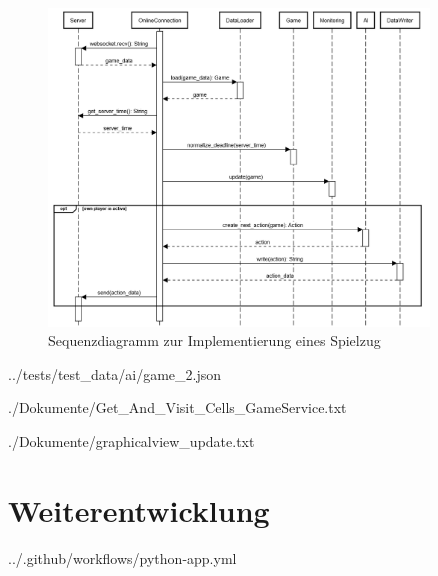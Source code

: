 \begin{figure}[htb]
	\centering
	\includegraphics[width=0.9\textwidth]{Bilder/Sequenzdiagramm_Implementierung_Spielzug.png}
	\caption{Sequenzdiagramm zur Implementierung eines Spielzug}
	\label{fig:sequenzdiagramm-spielzug}
\end{figure}

\begin{minipage}{\textwidth}
	
	{../tests/test_data/ai/game_2.json}
\end{minipage}

\begin{minipage}{\textwidth}
	
	{./Dokumente/Get_And_Visit_Cells_GameService.txt}
\end{minipage}

\begin{minipage}{\textwidth}
	
	{./Dokumente/graphicalview_update.txt}
\end{minipage}

\section{Weiterentwicklung}
\label{sec:anhang-weiterentwicklung}

\begin{minipage}{\textwidth}
	
	{../.github/workflows/python-app.yml}
\end{minipage}